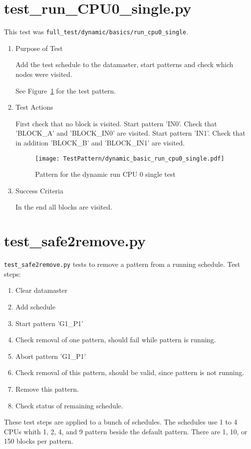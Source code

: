 \documentclass[12pt,a4paper]{report}
\begin{document}
\section{test\_run\_CPU0\_single.py}
This test was \texttt{full\_test/dynamic/basics/run\_cpu0\_single}.
\begin{enumerate}
  \item Purpose of Test

    Add the test schedule to the datamaster, start patterns and check
    which nodes were visited.

  See Figure~\ref{fig:Pattern_for_the_dynamic_run_CPU_0_single_test}
  for the test pattern.
  \item Test Actions

    First check that no block is visited. Start pattern 'IN0'. Check
    that 'BLOCK\_A' and 'BLOCK\_IN0' are visited.
    Start pattern 'IN1'. Check that in addition 'BLOCK\_B' and
    'BLOCK\_IN1' are visited.
    \begin{figure}
        \centering
        \texttt{[image: TestPattern/dynamic\_basic\_run\_cpu0\_single.pdf]}
        \caption{Pattern for the dynamic run CPU 0 single test}
        \label{fig:Pattern_for_the_dynamic_run_CPU_0_single_test}
    \end{figure}
  \item Success Criteria

  In the end all blocks are visited.
\end{enumerate}

\section{test\_safe2remove.py}
\texttt{test\_safe2remove.py} tests to remove a pattern from a running schedule. Test steps:
\begin{enumerate}
\item Clear datamaster
\item Add schedule
\item Start pattern 'G1\_P1'
\item Check removal of one pattern, should fail while pattern is running.
\item Abort pattern 'G1\_P1'
\item Check removal of this pattern, should be valid, since pattern is not running.
\item Remove this pattern.
\item Check status of remaining schedule.
\end{enumerate}
These test steps are applied to a bunch of schedules.
The schedules use 1 to 4 CPUs whith 1, 2, 4, and 9 pattern beside the default pattern. There are 1, 10, or 150 blocks per pattern.
\end{document}

